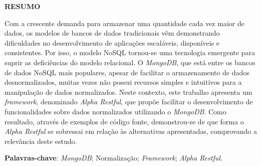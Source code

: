\vfill
\begin{center}
{\textbf{RESUMO}\\}
\end{center}
\noindent

Com a crescente demanda para armazenar uma quantidade cada vez maior de dados, os modelos de bancos de dados tradicionais vêm demonstrando dificuldades no desenvolvimento de aplicações escaláveis, disponíveis e consistentes. Por isso, o modelo NoSQL tornou-se uma tecnologia emergente para suprir as deficiências do modelo relacional. O \textit{MongoDB}, que está entre os bancos de dados NoSQL mais populares, apesar de facilitar o armazenamento de dados desnormalizados, muitas vezes não possui recursos simples e intuitivos para a manipulação de dados normalizados. Neste contexto, este trabalho apresenta um \textit{framework}, denominado \textit{Alpha Restful}, que propõe facilitar o desenvolvimento de funcionalidades sobre dados normalizados utilizando o \textit{MongoDB}. Como resultado, através de exemplos de código fonte, demonstrou-se de que forma o \textit{Alpha Restful} se sobressai em relação às alternativas apresentadas, comprovando a relevância deste estudo.

\vspace{\onelineskip}
 \noindent
 \textbf{Palavras-chave}: \textit{MongoDB}; Normalização; \textit{Framework}; \textit{Alpha Restful}.
